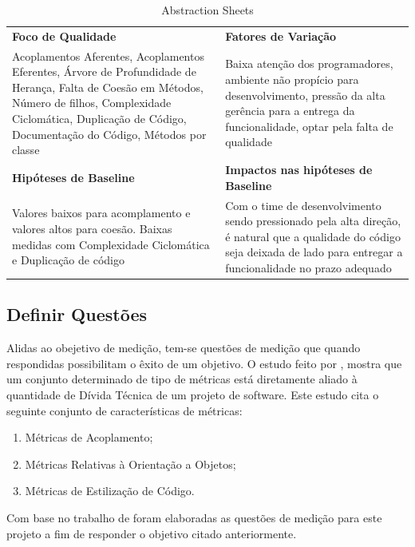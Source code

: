 \begin{table}[ht]
\caption{Abstraction Sheets}
\centering
\begin{tabular}{p{5cm}|p{5cm}}
  \textbf{Foco de Qualidade}   & \textbf{Fatores de Variação}  \\
  Acoplamentos Aferentes, Acoplamentos Eferentes,
  Árvore de Profundidade de Herança, Falta de Coesão em Métodos, Número de filhos,
  Complexidade Ciclomática, Duplicação de Código, Documentação do Código,
  Métodos por classe
  &
  Baixa atenção dos programadores,
  ambiente não propício para desenvolvimento, pressão da alta gerência para
  a entrega da funcionalidade, optar pela falta de qualidade
  \\
\hline
\textbf{Hipóteses de Baseline} & \textbf{Impactos nas hipóteses de Baseline} \\

Valores baixos para acomplamento e valores altos para coesão. Baixas medidas com
Complexidade Ciclomática e Duplicação de código
&
Com o time de desenvolvimento sendo pressionado pela alta direção, é natural
que a qualidade do código seja deixada de lado para entregar a funcionalidade
no prazo adequado
\\

\end{tabular}
\label{table:abstraction}
\end{table}

\subsection{Definir Questões}
Alidas ao obejetivo de medição, tem-se questões de medição que quando respondidas
possibilitam o êxito de um objetivo. O estudo feito por \cite{oliveira}, mostra que
um conjunto determinado de tipo de métricas está diretamente aliado à quantidade
de Dívida Técnica de um projeto de software. Este estudo cita o seguinte conjunto de
características de métricas:

\begin{enumerate}
  \item Métricas de Acoplamento;
  \item Métricas Relativas à Orientação a Objetos;
  \item Métricas de Estilização de Código.
\end{enumerate}


Com base no trabalho de \cite{siebra} foram elaboradas as questões de medição
para este projeto a fim de responder o objetivo citado anteriormente.

